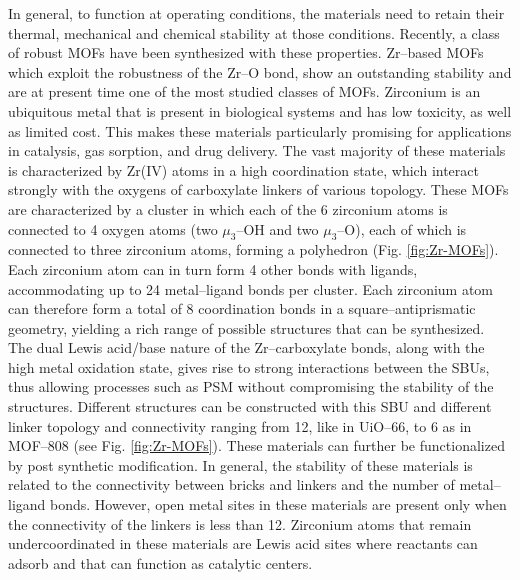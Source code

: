 In general, to function at operating conditions, the materials need to retain their thermal, mechanical and chemical stability at those conditions. Recently, a class of robust MOFs have been synthesized with these properties\cite{furukawa2014water}. Zr--based MOFs\cite{bai2016zr} which exploit the robustness of the Zr--O bond, show an outstanding stability and are at present time one of the most studied classes of MOFs. Zirconium is an ubiquitous metal that is present in biological systems and has low toxicity, as well as limited cost. This makes these materials particularly promising for applications in catalysis, gas sorption, and drug delivery. The vast majority of these materials is characterized by Zr(IV) atoms in a high coordination state, which interact strongly with the oxygens of carboxylate linkers of various topology. These MOFs are characterized by a  cluster in which each of the 6 zirconium atoms is connected to 4 oxygen atoms (two $\mu_3$--OH and two $\mu_3$--O), each of which is connected to three zirconium atoms, forming a polyhedron (Fig. \ref{fig:Zr-MOFs}). Each zirconium atom can in turn form 4 other bonds with ligands, accommodating up to 24 metal--ligand bonds per cluster. Each zirconium atom can therefore form a total of 8 coordination bonds in a square--antiprismatic geometry, yielding a rich range of possible structures that can be synthesized. The dual Lewis acid/base nature of the Zr--carboxylate bonds, along with the high metal oxidation state, gives rise to strong interactions between the SBUs, thus allowing processes such as PSM without compromising the stability of the structures. 
Different structures can be constructed with this SBU and different linker topology and connectivity ranging from 12, like in UiO--66, to 6 as in MOF--808 (see Fig. \ref{fig:Zr-MOFs}). These materials can further be functionalized by post synthetic modification. In general, the stability of these materials is related to the connectivity between bricks and linkers and the number of metal--ligand bonds. However, open metal sites in these materials are present only when the connectivity of the linkers is less than 12. Zirconium atoms that remain undercoordinated in these materials are Lewis acid sites where reactants can adsorb and that can function as catalytic centers.

